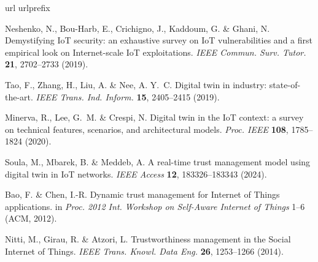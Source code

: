 \documentclass[lineno,pdflatex,sn-nature]{sn-jnl}
\theoremstyle{thmstyleone}%
\theoremstyle{thmstylethree}%
\begin{document}
\begin{thebibliography}{10}
\expandafter\ifx\csname url\endcsname\relax
  \def\url#1{\burl{#1}}\fi
\expandafter\ifx\csname urlprefix\endcsname\relax\def\urlprefix{URL }\fi
\providecommand{\bibinfo}[2]{#2}
\providecommand{\eprint}[2][]{\url{#2}}
\providecommand{\doi}[1]{\url{https://doi.org/#1}}
\bibcommenthead

\bibinfo{author}{Neshenko, N.}, \bibinfo{author}{Bou-Harb, E.},
  \bibinfo{author}{Crichigno, J.}, \bibinfo{author}{Kaddoum, G.} \&
  \bibinfo{author}{Ghani, N.}
\newblock \bibinfo{title}{Demystifying {IoT} security: an exhaustive survey on
  {IoT} vulnerabilities and a first empirical look on {Internet}-scale {IoT}
  exploitations}.
\newblock \emph{\bibinfo{journal}{IEEE Commun. Surv. Tutor.}}
  \textbf{\bibinfo{volume}{21}}, \bibinfo{pages}{2702--2733}
  (\bibinfo{year}{2019}).

\bibinfo{author}{Tao, F.}, \bibinfo{author}{Zhang, H.}, \bibinfo{author}{Liu,
  A.} \& \bibinfo{author}{Nee, A. Y.~C.}
\newblock \bibinfo{title}{Digital twin in industry: state-of-the-art}.
\newblock \emph{\bibinfo{journal}{IEEE Trans. Ind. Inform.}}
  \textbf{\bibinfo{volume}{15}}, \bibinfo{pages}{2405--2415}
  (\bibinfo{year}{2019}).

\bibinfo{author}{Minerva, R.}, \bibinfo{author}{Lee, G.~M.} \&
  \bibinfo{author}{Crespi, N.}
\newblock \bibinfo{title}{Digital twin in the {IoT} context: a survey on
  technical features, scenarios, and architectural models}.
\newblock \emph{\bibinfo{journal}{Proc. IEEE}} \textbf{\bibinfo{volume}{108}},
  \bibinfo{pages}{1785--1824} (\bibinfo{year}{2020}).

\bibinfo{author}{Soula, M.}, \bibinfo{author}{Mbarek, B.} \&
  \bibinfo{author}{Meddeb, A.}
\newblock \bibinfo{title}{A real-time trust management model using digital twin
  in {IoT} networks}.
\newblock \emph{\bibinfo{journal}{IEEE Access}} \textbf{\bibinfo{volume}{12}},
  \bibinfo{pages}{183326--183343} (\bibinfo{year}{2024}).

Bao, F. \& Chen, I.-R. Dynamic trust management for {Internet} of {Things} applications. in \emph{Proc. 2012 Int. Workshop on Self-Aware Internet of Things} 1--6 (ACM, 2012).

\bibinfo{author}{Nitti, M.}, \bibinfo{author}{Girau, R.} \&
  \bibinfo{author}{Atzori, L.}
\newblock \bibinfo{title}{Trustworthiness management in the {Social Internet of
  Things}}.
\newblock \emph{\bibinfo{journal}{IEEE Trans. Knowl. Data Eng.}}
  \textbf{\bibinfo{volume}{26}}, \bibinfo{pages}{1253--1266}
  (\bibinfo{year}{2014}).


\end{thebibliography}
\end{document}
